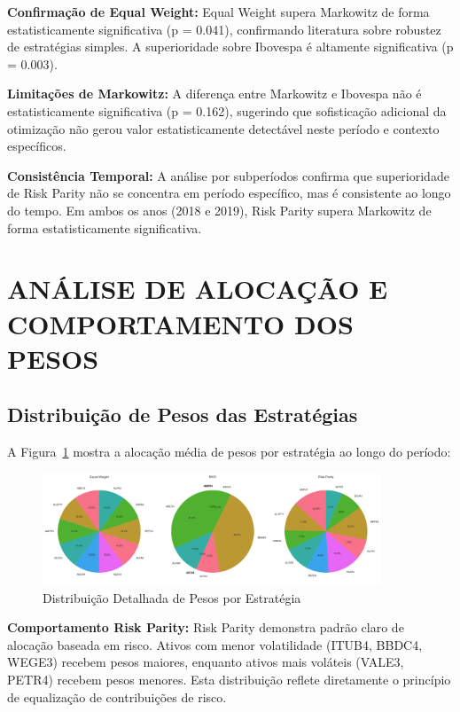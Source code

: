 \textbf{Confirmação de Equal Weight:} Equal Weight supera Markowitz de forma estatisticamente significativa (p = 0.041), confirmando literatura sobre robustez de estratégias simples. A superioridade sobre Ibovespa é altamente significativa (p = 0.003).

\textbf{Limitações de Markowitz:} A diferença entre Markowitz e Ibovespa não é estatisticamente significativa (p = 0.162), sugerindo que sofisticação adicional da otimização não gerou valor estatisticamente detectável neste período e contexto específicos.

\textbf{Consistência Temporal:} A análise por subperíodos confirma que superioridade de Risk Parity não se concentra em período específico, mas é consistente ao longo do tempo. Em ambos os anos (2018 e 2019), Risk Parity supera Markowitz de forma estatisticamente significativa.

\section{ANÁLISE DE ALOCAÇÃO E COMPORTAMENTO DOS PESOS}

\subsection{Distribuição de Pesos das Estratégias}

A Figura~\ref{fig:alocacao_pesos_detalhada} mostra a alocação média de pesos por estratégia ao longo do período:

\begin{figure}[H]
\centering
\includegraphics[width=0.90\textwidth]{figures/alocacao_pesos.png}
\caption{Distribuição Detalhada de Pesos por Estratégia}
\label{fig:alocacao_pesos_detalhada}
\end{figure}

\textbf{Comportamento Risk Parity:} Risk Parity demonstra padrão claro de alocação baseada em risco. Ativos com menor volatilidade (ITUB4, BBDC4, WEGE3) recebem pesos maiores, enquanto ativos mais voláteis (VALE3, PETR4) recebem pesos menores. Esta distribuição reflete diretamente o princípio de equalização de contribuições de risco.

